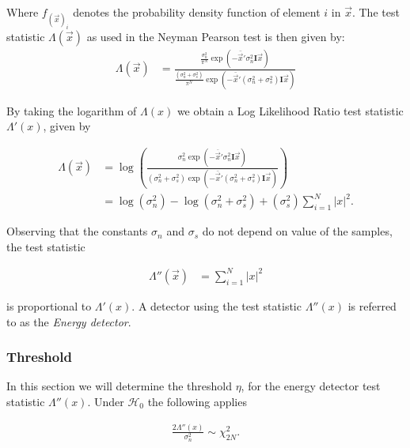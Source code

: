 \documentclass[a4paper, openany, oneside]{memoir}
\begin{document}
Where $f_{(\vec{x})_i}$ denotes the probability density function of element $i$ in $\vec{x}$.  The test statistic $\Lambda(\vec{x})$ as used in the Neyman Pearson test is then given by:
\begin{align*}
\Lambda(\vec{x}) &=\frac{\frac{\sigma_n^2}{\pi^N } \exp(-\bar{\vec{x}}'\sigma_n^2\mathbf{I}\vec{x})}{\frac{(\sigma_n^2 + \sigma_s^2)}{\pi^N } \exp(-\bar{\vec{x}}'(\sigma_n^2+\sigma_s^2)\mathbf{I}\vec{x})}
\end{align*}


By taking the logarithm of $\Lambda(x)$ we obtain a Log Likelihood Ratio test statistic $\Lambda'(x)$, given by

\begin{align*}
\Lambda(\vec{x}) &= \log \left(
\frac{\sigma_n^2\exp(-\overline{\vec{x}}'\sigma_n^2\mathbf{I}\vec{x})}{(\sigma_n^2 + \sigma_s^2)\exp(-\bar{\vec{x}}'(\sigma_n^2+\sigma_s^2)\mathbf{I}\vec{x})}\right) \\
&= \log\left(\sigma_n^2\right) - \log\left(\sigma_n^2 + \sigma_s^2\right) +  (\sigma_s^2) \sum_{i=1}^N |x|^2. 
\end{align*}

Observing that the constants $\sigma_n$ and $\sigma_s$ do not depend on value of the samples, the test statistic 

\begin{align*}
\Lambda''(\vec{x}) &= \sum_{i=1}^N |x|^2
\end{align*} 

is proportional to $\Lambda'(x)$. A detector using the test statistic $\Lambda''(x)$ is  referred to as the \emph{Energy detector}. 

\subsubsection{Threshold}
In this section we will determine the threshold $\eta$, for the energy detector test statistic $\Lambda''(x)$.
Under $\mathcal{H}_0$ the following applies\cite{teguigspectrum2014}  

\begin{align}
    \frac{2\Lambda''(x)}{\sigma_n^2} \sim \chi^2_{2N}.
\end{align}

\end{document}
